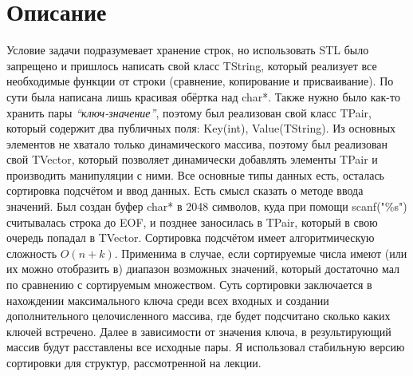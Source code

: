 \documentclass[pdf, unicode, 12pt, a4paper,oneside,fleqn]{article}
\begin{document}
\section{Описание}
Условие задачи подразумевает хранение строк, но использовать STL было запрещено и пришлось написать свой класс TString, который реализует все необходимые функции от строки (сравнение, копирование и присваивание). По сути была написана лишь красивая обёртка над char*.\newline
Также нужно было как-то хранить пары \textit{\enquote{ключ-значение}}, поэтому был реализован свой класс TPair, который содержит два публичных поля: Key(int), Value(TString).\newline
Из основных элементов не хватало только динамического массива, поэтому был реализован свой TVector, который позволяет динамически добавлять элементы TPair и производить манипуляции с ними. \newline
Все основные типы данных есть, осталась сортировка подсчётом и ввод данных.\newline
Есть смысл сказать о методе ввода значений. Был создан буфер char* в 2048 символов, куда при помощи scanf("\%s") считывалась строка до EOF, и позднее заносилась в TPair, который в свою очередь попадал в TVector.\newline
Сортировка подсчётом имеет алгоритмическую сложность $O(n+k)$. \newline Применима в случае, если сортируемые числа имеют (или их можно отобразить в) диапазон возможных значений, который достаточно мал по сравнению с сортируемым множеством. \newline 
Суть сортировки заключается в нахождении максимального ключа среди всех входных и создании дополнительного целочисленного массива, где будет подсчитано сколько каких ключей встречено. Далее в зависимости от значения ключа, в результирующий массив будут расставлены все исходные пары.\newline
Я использовал стабильную версию сортировки для структур, рассмотренной на лекции. 
\pagebreak
\end{document}

